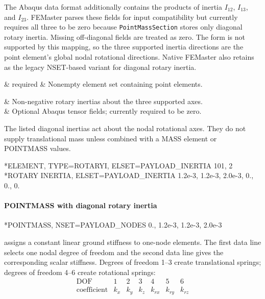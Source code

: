The Abaqus data format additionally contains the products of inertia \(I_{12}\), \(I_{13}\), and \(I_{23}\). FEMaster parses these fields for input compatibility but currently requires all three to be zero because \texttt{PointMassSection} stores only diagonal rotary inertia. Missing off-diagonal fields are treated as zero. The  form is not supported by this mapping, so the three supported inertia directions are the point element's global nodal rotational directions. Native FEMaster also retains  as the legacy NSET-based variant for diagonal rotary inertia.

\begin{keywordparameters}
 & required & Nonempty element set containing  point elements. \\
\end{keywordparameters}

\begin{keyworddata}
 & Non-negative rotary inertias about the three supported axes. \\
 & Optional Abaqus tensor fields; currently required to be zero. \\
\end{keyworddata}

The listed diagonal inertias act about the nodal rotational axes. They do not supply translational mass unless combined with a MASS element or POINTMASS values.

\exampleheading
\begin{inputdeck}
*ELEMENT, TYPE=ROTARYI, ELSET=PAYLOAD_INERTIA
101, 2
*ROTARY INERTIA, ELSET=PAYLOAD_INERTIA
1.2e-3, 1.2e-3, 2.0e-3, 0., 0., 0.
\end{inputdeck}

\paragraph*{POINTMASS with diagonal rotary inertia}
\begin{inputdeck}
*POINTMASS, NSET=PAYLOAD_NODES
0.,
1.2e-3, 1.2e-3, 2.0e-3
\end{inputdeck}


 assigns a constant linear ground stiffness to one-node  elements. The first data line selects one nodal degree of freedom and the second data line gives the corresponding scalar stiffness. Degrees of freedom 1--3 create translational springs; degrees of freedom 4--6 create rotational springs:
\[
\begin{array}{c|cccccc}
\text{DOF} & 1 & 2 & 3 & 4 & 5 & 6 \\
\hline
\text{coefficient} & k_x & k_y & k_z & k_{rx} & k_{ry} & k_{rz}
\end{array}
\]

